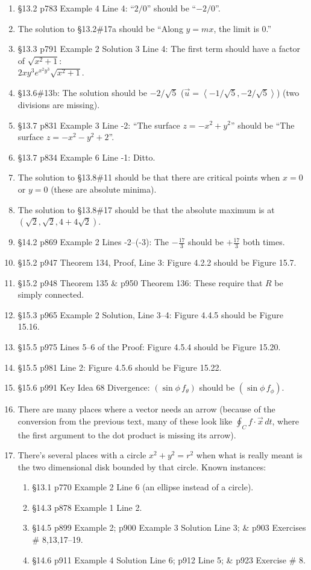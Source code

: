 \documentclass{amsart}
\newcommand{\bracket}[1]{\left\langle#1\right\rangle}
\begin{document}
\begin{enumerate}
\item \S13.2 p783 Example 4 Line 4: ``$2/0$'' should be ``$-2/0$''.
\item The solution to \S13.2\#17a should be ``Along $y=mx$, the limit is 0.''
\item \S13.3 p791 Example 2 Solution 3 Line 4: The first term should have a factor of $\sqrt{x^2+1}$:\\
$2xy^3e^{x^2y^3}\sqrt{x^2+1}$.
\item \S13.6\#13b: The solution should be $-2/\sqrt5$ ($\vec u =\bracket{-1/\sqrt5,-2/\sqrt5}$) (two divisions are missing).
\item \S13.7 p831 Example 3 Line -2: ``The surface $z=-x^2+y^2$'' should be ``The surface $z=-x^2-y^2+2$''.
\item \S13.7 p834 Example 6 Line -1: Ditto.
\item The solution to \S13.8\#11 should be that there are critical points when $x=0$ or $y=0$ (these are absolute minima).
\item The solution to \S13.8\#17 should be that the absolute maximum is at $(\sqrt2,\sqrt2,4+4\sqrt2)$.
\item \S14.2 p869 Example 2 Lines -2--(-3): The $-\frac{17}3$ should be $+\frac{17}3$ both times.
\item \S15.2 p947 Theorem 134, Proof, Line 3: Figure 4.2.2 should be Figure 15.7.
\item \S15.2 p948 Theorem 135 \& p950 Theorem 136: These require that $R$ be simply connected.
\item \S15.3 p965 Example 2 Solution, Line 3--4: Figure 4.4.5 should be Figure 15.16.
\item \S15.5 p975 Lines 5--6 of the Proof: Figure 4.5.4 should be Figure 15.20.
\item \S15.5 p981 Line 2: Figure 4.5.6 should be Figure 15.22.
\item \S15.6 p991 Key Idea 68 Divergence: $(\sin \phi \,f_{\theta})$ should be $(\sin \phi \,f_{\phi})$.
\item There are many places where a vector needs an arrow (because of the conversion from the previous text, many of these look like $\oint_C f\cdot\vec x\,dt$, where the first argument to the dot product is missing its arrow).
\item There's several places with a circle $x^2+y^2=r^2$ when what is really meant is the two dimensional disk bounded by that circle.  Known instances:
\begin{enumerate}
\item \S13.1 p770 Example 2 Line 6 (an ellipse instead of a circle).
\item \S14.3 p878 Example 1 Line 2.
\item \S14.5 p899 Example 2; p900 Example 3 Solution Line 3; \& p903 Exercises \# 8,13,17--19.
\item \S14.6 p911 Example 4 Solution Line 6; p912 Line 5; \& p923 Exercise \# 8.
\end{enumerate}
\label{2017-05IIIplus}
\end{enumerate}
\end{document}

